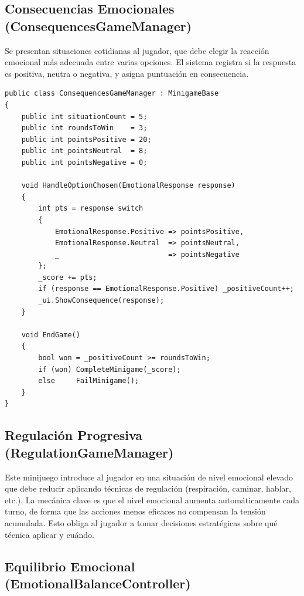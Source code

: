 \documentclass[12pt, a4paper]{report}
\begin{document}
\subsection{Consecuencias Emocionales (ConsequencesGameManager)}

Se presentan situaciones cotidianas al jugador, que debe elegir la reacción
emocional más adecuada entre varias opciones. El sistema registra si la
respuesta es positiva, neutra o negativa, y asigna puntuación en consecuencia.

\begin{lstlisting}[caption={ConsequencesGameManager.cs — Evaluación de respuestas emocionales},
                   label={lst:consequences}]
public class ConsequencesGameManager : MinigameBase
{
    public int situationCount = 5;
    public int roundsToWin    = 3;
    public int pointsPositive = 20;
    public int pointsNeutral  = 8;
    public int pointsNegative = 0;

    void HandleOptionChosen(EmotionalResponse response)
    {
        int pts = response switch
        {
            EmotionalResponse.Positive => pointsPositive,
            EmotionalResponse.Neutral  => pointsNeutral,
            _                          => pointsNegative
        };
        _score += pts;
        if (response == EmotionalResponse.Positive) _positiveCount++;
        _ui.ShowConsequence(response);
    }

    void EndGame()
    {
        bool won = _positiveCount >= roundsToWin;
        if (won) CompleteMinigame(_score);
        else     FailMinigame();
    }
}
\end{lstlisting}

\subsection{Regulación Progresiva (RegulationGameManager)}

Este minijuego introduce al jugador en una situación de nivel emocional
elevado que debe reducir aplicando técnicas de regulación (respiración,
caminar, hablar, etc.). La mecánica clave es que el nivel emocional aumenta
automáticamente cada turno, de forma que las acciones menos eficaces no
compensan la tensión acumulada. Esto obliga al jugador a tomar decisiones
estratégicas sobre qué técnica aplicar y cuándo.

\subsection{Equilibrio Emocional (EmotionalBalanceController)}
\end{document}
